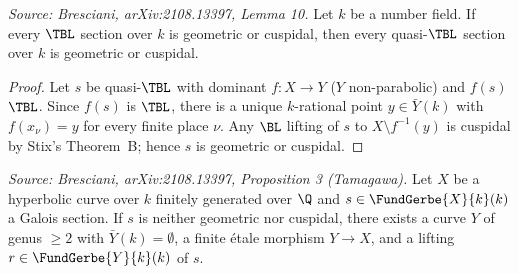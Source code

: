 \begin{lemma}[QuasiNF]
  \label{lem:quasi-nf}
  \textit{Source: Bresciani, arXiv:2108.13397, Lemma 10.}
  Let \(k\) be a number field. If every \(\TBL\) section over \(k\) is geometric or
  cuspidal, then every quasi-\(\TBL\) section over \(k\) is geometric or cuspidal.
\end{lemma}

\begin{proof}
  Let \(s\) be quasi-\(\TBL\) with dominant \(f : X \to Y\) (\(Y\) non-parabolic) and
  \(f(s)\) \(\TBL\). Since \(f(s)\) is \(\TBL\), there is a unique \(k\)-rational
  point \(y \in \bar{Y}(k)\) with \(f(x_\nu) = y\) for every finite place \(\nu\).
  Any \(\BL\) lifting of \(s\) to \(X \setminus f^{-1}(y)\) is cuspidal by Stix's
  Theorem~B; hence \(s\) is geometric or cuspidal.
\end{proof}

\begin{proposition}[TamagawaLem]
  \label{prop:tamagawa}
  \textit{Source: Bresciani, arXiv:2108.13397, Proposition 3 (Tamagawa).}
  Let \(X\) be a hyperbolic curve over \(k\) finitely generated over \(\Q\) and
  \(s \in \FundGerbe{X}{k}(k)\) a Galois section. If \(s\) is neither geometric nor
  cuspidal, there exists a curve \(Y\) of genus \(\geq 2\) with \(\bar{Y}(k) = \emptyset\),
  a finite étale morphism \(Y \to X\), and a lifting \(r \in \FundGerbe{Y}{k}(k)\) of
  \(s\).
\end{proposition}

